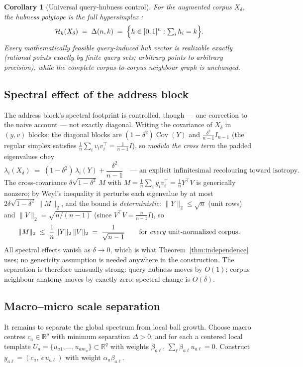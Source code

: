 \documentclass[11pt]{article}
\newcommand{\Cov}{\operatorname{Cov}}
\newtheorem{corollary}[theorem]{Corollary}
\begin{document}
\begin{corollary}[Universal query-hubness control]\label{cor:hypersimplex}
For the augmented corpus $X_\delta$, the hubness polytope is the full
hypersimplex \cite{ziegler95}:
\[
\mathcal{H}_k(X_\delta) \;=\; \Delta(n,k)
\;=\; \Bigl\{h \in [0,1]^n : \textstyle\sum_i h_i = k\Bigr\}.
\]
Every mathematically feasible query-induced hub vector is realizable exactly
(rational points exactly by finite query sets; arbitrary points to arbitrary
precision), while the complete corpus-to-corpus neighbour graph is unchanged.
\end{corollary}

\subsection{Spectral effect of the address block}

The address block's spectral footprint is controlled, though --- one correction
to the naive account --- not exactly diagonal. Writing the covariance of
$X_\delta$ in $(y,v)$ blocks: the diagonal blocks are $(1-\delta^2)\Cov(Y)$ and
$\tfrac{\delta^2}{n-1} I_{n-1}$ (the regular simplex satisfies
$\tfrac1n \sum_i v_i v_i^\top = \tfrac{1}{n-1} I$), so \emph{modulo the cross
term} the padded eigenvalues obey
\[
\lambda_i(X_\delta) \;=\; (1-\delta^2)\,\lambda_i(Y) + \frac{\delta^2}{n-1}
\quad\text{--- an explicit infinitesimal recolouring toward isotropy.}
\]
The cross-covariance
$\delta\sqrt{1-\delta^2}\,M$ with $M = \tfrac1n \sum_i y_i v_i^\top =
\tfrac1n Y^\top V$ is generically nonzero; by Weyl's inequality it perturbs
each eigenvalue by at most $2\delta\sqrt{1-\delta^2}\,\|M\|_2$, and the bound
is \emph{deterministic}: $\|Y\|_2 \le \sqrt{n}$ (unit rows) and
$\|V\|_2 = \sqrt{n/(n-1)}$ (since $V^\top V = \tfrac{n}{n-1}I$), so
\[
\|M\|_2 \;\le\; \frac1n\,\|Y\|_2\,\|V\|_2 \;=\; \frac{1}{\sqrt{n-1}}
\qquad\text{for \emph{every} unit-normalized corpus.}
\]
All spectral effects vanish as $\delta \to 0$, which is what
Theorem~\ref{thm:independence} uses; no genericity assumption is needed
anywhere in the construction. The separation is therefore unusually
strong: query hubness moves by $O(1)$; corpus neighbour anatomy moves by
exactly zero; spectral change is $O(\delta)$.

\subsection{Macro--micro scale separation}

It remains to separate the global spectrum from local ball growth. Choose macro
centres $c_a \in \mathbb{R}^p$ with minimum separation $\Delta > 0$, and for
each a centered local template
$U_a = \{u_{a1},\dots,u_{am_a}\} \subset \mathbb{R}^q$ with weights
$\beta_{a\ell}$, $\sum_\ell \beta_{a\ell} u_{a\ell} = 0$. Construct
$y_{a\ell} = (c_a,\ \epsilon\, u_{a\ell})$ with weight
$\alpha_a \beta_{a\ell}$.
\end{document}

